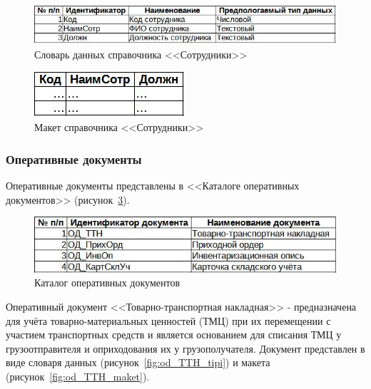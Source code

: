 \documentclass[12pt, a4paper, simple]{eskdtext}
\begin{document}
    \begin{figure}[!h]
        \centering
        \includegraphics[]
            {_docs/СД_Сотр_типы.jpg}
        \caption{Словарь данных справочника <<Сотрудники>>}
        \label{fig:cd_Sotr_tipi}
    \end{figure}

    \begin{figure}[!h]
        \centering
        \includegraphics[]
            {_docs/СД_Сотр_макет.jpg}
        \caption{Макет справочника <<Сотрудники>>}
        \label{fig:cd_Sotr_maket}
    \end{figure}

    \subsubsection{Оперативные документы}

    Оперативные документы представлены в <<Каталоге оперативных документов>> (рисунок~\ref{fig:od}).
    
    \begin{figure}[!h]
        \centering
        \includegraphics[]
            {_docs/ОД.jpg}
        \caption{Каталог оперативных документов}
        \label{fig:od}
    \end{figure}

    Оперативный документ <<Товарно-транспортная накладная>> - предназначена для учёта
    товарно-материальных ценностей (ТМЦ) при их перемещении с участием транспортных средств
    и является основанием для списания ТМЦ у грузоотправителя и оприходования их у грузополучателя.
    Документ представлен в виде словаря данных (рисунок~\ref{fig:od_TTH_tipi})
    и макета (рисунок~\ref{fig:od_TTH_maket}).
\end{document}
